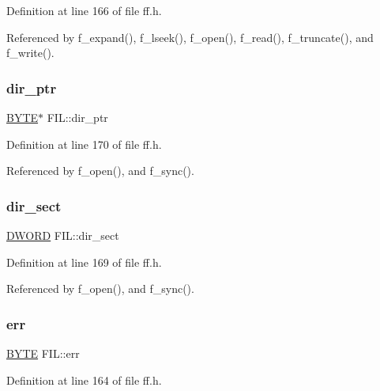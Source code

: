 Definition at line 166 of file ff.\+h.



Referenced by f\+\_\+expand(), f\+\_\+lseek(), f\+\_\+open(), f\+\_\+read(), f\+\_\+truncate(), and f\+\_\+write().

\mbox{\label{structFIL_a5af9e9fb312b629220eaf684dd28c4a9}} 
\subsubsection{\texorpdfstring{dir\+\_\+ptr}{dir\_ptr}}
{\footnotesize\ttfamily \hyperlink{integer_8h_a4ae1dab0fb4b072a66584546209e7d58}{B\+Y\+TE}$\ast$ F\+I\+L\+::dir\+\_\+ptr}



Definition at line 170 of file ff.\+h.



Referenced by f\+\_\+open(), and f\+\_\+sync().

\mbox{\label{structFIL_ab203794f939ad4480e81dfa488770783}} 
\subsubsection{\texorpdfstring{dir\+\_\+sect}{dir\_sect}}
{\footnotesize\ttfamily \hyperlink{integer_8h_ad342ac907eb044443153a22f964bf0af}{D\+W\+O\+RD} F\+I\+L\+::dir\+\_\+sect}



Definition at line 169 of file ff.\+h.



Referenced by f\+\_\+open(), and f\+\_\+sync().

\mbox{\label{structFIL_aea440945db26de9c4a88065c0c887fda}} 
\subsubsection{\texorpdfstring{err}{err}}
{\footnotesize\ttfamily \hyperlink{integer_8h_a4ae1dab0fb4b072a66584546209e7d58}{B\+Y\+TE} F\+I\+L\+::err}



Definition at line 164 of file ff.\+h.



